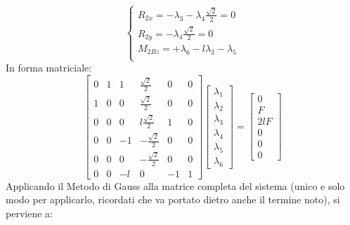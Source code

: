 \documentclass{article}
\begin{document}
\begin{adjustwidth}{2in}{}
\[\begin{cases}
	R_{2x} = -\lambda_3 - \lambda_4\frac{\sqrt{2}}{2} = 0 \\
	R_{2y} = - \lambda_4\frac{\sqrt{2}}{2}  = 0 \\
	M_{2Bz} = +\lambda_6 -l\lambda_3 - \lambda_5 \\
	\end{cases}
\]	
In forma matriciale:
\[
\left[ \begin{array}{cccccc}
	0 & 1 & 1 & \frac{\sqrt{2}}{2} & 0 & 0 \\
	1 & 0 & 0 & \frac{\sqrt{2}}{2} & 0 & 0 \\
	0 & 0 & 0 & l\frac{\sqrt{2}}{2} & 1 & 0 \\
	0 & 0 & -1 & -\frac{\sqrt{2}}{2} & 0 & 0 \\
	0 & 0 & 0 & -\frac{\sqrt{2}}{2} & 0 & 0 \\
	0 & 0 & -l & 0 & -1 & 1
\end{array}\right] \left[ \begin{array}{c}
\lambda_1 \\
\lambda_2\\
\lambda_3\\
\lambda_4\\
\lambda_5\\
\lambda_6
\end{array}\right] = \left[ \begin{array}{c}
0 \\
F \\
2lF \\
0 \\
0 \\
0
\end{array}\right] 
\]
Applicando il Metodo di Gauss alla matrice completa del sistema (unico e solo modo per applicarlo, ricordati che va portato dietro anche il termine noto), si perviene a: 
\[
\begin{array}{c}


\end{array}\]
\end{adjustwidth}
\end{document}
